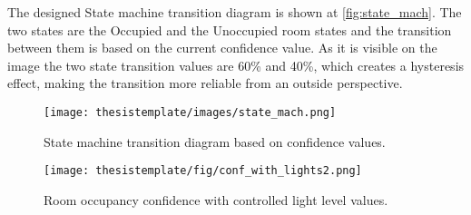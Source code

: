 The designed State machine transition diagram is shown at \autoref{fig:state_mach}. The two states are the Occupied and the Unoccupied room states and the transition between them is based on the current confidence value. As it is visible on the image the two state transition values are 60\% and 40\%, which creates a hysteresis effect, making the transition more reliable from an outside perspective.



\begin{figure}[ht!]
  \begin{center}
    \texttt{[image: thesistemplate/images/state\_mach.png]}
    \caption{State machine transition diagram based on confidence values.}
    \label{fig:state_mach}
  \end{center}
\end{figure}


\begin{figure}[h!]
  \begin{center}
    \texttt{[image: thesistemplate/fig/conf\_with\_lights2.png]}
    \caption{Room occupancy confidence with controlled light level values.}
    \label{fig:conf_with_lights}
  \end{center}
\end{figure}